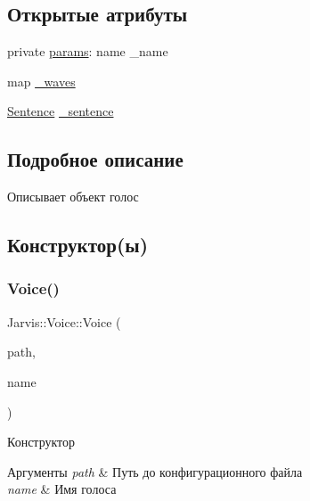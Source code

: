 \subsection*{Открытые атрибуты}
\begin{DoxyCompactItemize}
\item 
private \hyperlink{classJarvis_1_1Voice_a23e07f1f4dfbe872ff95b53e32bad443}{params}\+: name \+\_\+name
\item 
map \hyperlink{classJarvis_1_1Voice_a70bc48a33f97bd1cf3b43e08824a041c}{\+\_\+waves}
\item 
\hyperlink{classJarvis_1_1Sentence}{Sentence} \hyperlink{classJarvis_1_1Voice_ac0a2f9e53d5b74b3ad7e84b0f203d4c4}{\+\_\+sentence}
\end{DoxyCompactItemize}


\subsection{Подробное описание}
Описывает объект голос 

\subsection{Конструктор(ы)}
\mbox{\label{classJarvis_1_1Voice_a79c708aebcb92b2d3f74de9992f1082a}} 
\subsubsection{\texorpdfstring{Voice()}{Voice()}\hspace{0.1cm}{\footnotesize\ttfamily [1/3]}}
{\footnotesize\ttfamily Jarvis\+::\+Voice\+::\+Voice (\begin{DoxyParamCaption}\item[{const path \&}]{path,  }\item[{const name \&}]{name }\end{DoxyParamCaption})}



Конструктор 


\begin{DoxyParams}{Аргументы}
{\em path} & Путь до конфигурационного файла \\
\hline
{\em name} & Имя голоса \\
\hline
\end{DoxyParams}
\mbox{\label{classJarvis_1_1Voice_ab1b0b2c2bb6d175b34970086cce05245}} 
